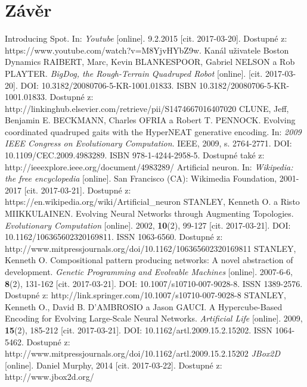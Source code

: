 \documentclass[a4]{article}
\begin{document}
\section{Závěr} 
\begin{thebibliography}{8}
Introducing Spot. In: \textit{Youtube} [online]. 9.2.2015 [cit. 2017-03-20]. Dostupné z: https://www.youtube.com/watch?v=M8YjvHYbZ9w. Kanál uživatele Boston Dynamics
RAIBERT, Marc, Kevin BLANKESPOOR, Gabriel NELSON a Rob PLAYTER. \textit{BigDog, the Rough-Terrain Quadruped Robot} [online]. [cit. 2017-03-20]. DOI: 10.3182/20080706-5-KR-1001.01833. ISBN 10.3182/20080706-5-KR-1001.01833. Dostupné z: http://linkinghub.elsevier.com/retrieve/pii/S1474667016407020
CLUNE, Jeff, Benjamin E. BECKMANN, Charles OFRIA a Robert T. PENNOCK. Evolving coordinated quadruped gaits with the HyperNEAT generative encoding. In: \textit{2009 IEEE Congress on Evolutionary Computation}. IEEE, 2009, s. 2764-2771. DOI: 10.1109/CEC.2009.4983289. ISBN 978-1-4244-2958-5. Dostupné také z: http://ieeexplore.ieee.org/document/4983289/
Artificial neuron. In: \textit{Wikipedia: the free encyclopedia} [online]. San Francisco (CA): Wikimedia Foundation, 2001-2017 [cit. 2017-03-21]. Dostupné z: https://en.wikipedia.org/wiki/Artificial\_neuron
STANLEY, Kenneth O. a Risto MIIKKULAINEN. Evolving Neural Networks through Augmenting Topologies. \emph{Evolutionary Computation} [online]. 2002, \textbf{10}(2), 99-127 [cit. 2017-03-21]. DOI: 10.1162/106365602320169811. ISSN 1063-6560. Dostupné z: http://www.mitpressjournals.org/doi/10.1162/106365602320169811
STANLEY, Kenneth O. Compositional pattern producing networks: A novel abstraction of development. \emph{Genetic Programming and Evolvable Machines} [online]. 2007-6-6, \textbf{8}(2), 131-162 [cit. 2017-03-21]. DOI: 10.1007/s10710-007-9028-8. ISSN 1389-2576. Dostupné z: http://link.springer.com/10.1007/s10710-007-9028-8
STANLEY, Kenneth O., David B. D'AMBROSIO a Jason GAUCI. A Hypercube-Based Encoding for Evolving Large-Scale Neural Networks. \textit{Artificial Life} [online]. 2009, \textbf{15}(2), 185-212 [cit. 2017-03-21]. DOI: 10.1162/artl.2009.15.2.15202. ISSN 1064-5462. Dostupné z: http://www.mitpressjournals.org/doi/10.1162/artl.2009.15.2.15202
\textit{JBox2D} [online]. Daniel Murphy, 2014 [cit. 2017-03-22]. Dostupné z: http://www.jbox2d.org/
\end{thebibliography}
\end{document}
